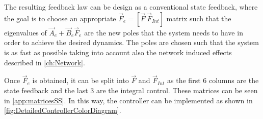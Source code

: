 The resulting feedback law can be design as a conventional state feedback, where the goal is to choose an appropriate $\vec{F}_e=[\vec{F} \ \vec{F}_{Int}]$ matrix such that the eigenvalues of $\vec{A}_e+\vec{B}_e\vec{F}_e$ are the new poles that the system needs to have in order to achieve the desired dynamics. The poles are chosen such that the system is as fast as possible taking into account also the network induced effects described in \autoref{ch:Network}.

Once $\vec{F}_e$ is obtained, it can be split into $\vec{F}$ and $\vec{F}_{Int}$ as the first 6 columns are the state feedback and the last 3 are the integral control. These matrices can be seen in \autoref{app:matricesSS}. In this way, the controller can be implemented as shown in \autoref{fig:DetailedControllerColorDiagram}.


